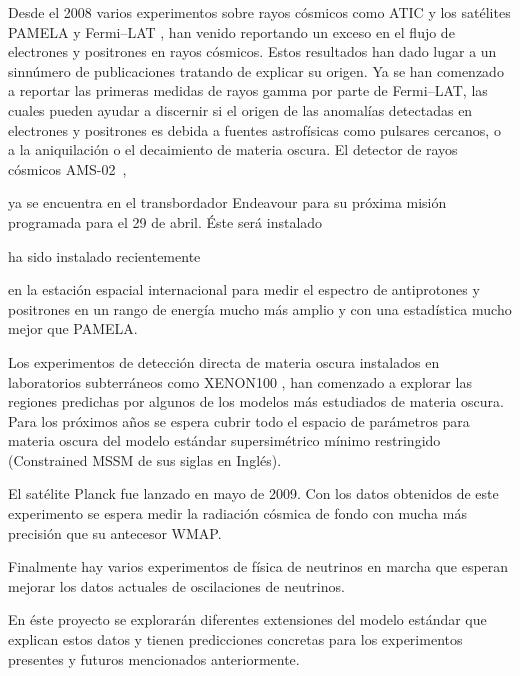 Desde el 2008 varios experimentos sobre rayos cósmicos como ATIC
\cite{:2008zzr} y los satélites PAMELA \cite{Adriani:2008zr} y
Fermi--LAT \cite{Abdo:2009zk}, han venido reportando un exceso en el
flujo de electrones y positrones en rayos cósmicos. Estos resultados
han dado lugar a un sinnúmero de publicaciones tratando de explicar su
origen. Ya se han comenzado a reportar las primeras medidas de rayos
gamma por parte de Fermi--LAT, las cuales pueden ayudar a discernir si
el origen de las anomalías detectadas en electrones y positrones es
debida a fuentes astrofísicas como pulsares cercanos, o a la
aniquilación o el decaimiento de materia oscura. El detector de rayos
cósmicos AMS-02~\cite{ams:2009},
\begin{soloproyecto}
ya se encuentra en el transbordador
Endeavour para su próxima misión programada para el 29 de abril. Éste
será instalado   
\end{soloproyecto}
\begin{soloficha}
  ha sido instalado recientemente
\end{soloficha}
en la estación espacial internacional para medir el
espectro de antiprotones y positrones en un rango de energía mucho más
amplio y con una estadística mucho mejor que PAMELA.


Los experimentos de detección directa de materia oscura instalados en
laboratorios subterráneos como XENON100 \cite{Aprile:2011ts}, han
comenzado a explorar las regiones predichas por algunos de los modelos
más estudiados de materia oscura. Para los próximos años se espera
cubrir todo el espacio de parámetros para materia oscura del modelo
estándar supersimétrico mínimo restringido (Constrained MSSM de sus
siglas en Inglés).

\begin{soloproyecto}
El satélite Planck fue lanzado en mayo de 2009.  Con los datos
obtenidos de este experimento se espera medir la radiación cósmica de
fondo con mucha más precisión que su antecesor WMAP.
\end{soloproyecto}

Finalmente hay varios experimentos de física de neutrinos en marcha
que esperan mejorar los datos actuales de oscilaciones de neutrinos.


En éste proyecto se explorarán diferentes extensiones del modelo
estándar que explican estos datos y tienen predicciones
concretas para los experimentos presentes y futuros mencionados
anteriormente.

